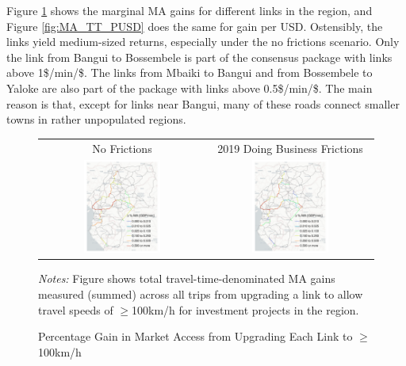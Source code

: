 \documentclass[a4paper]{article}
\begin{document}
Figure \ref{fig:MA_TT_PP} shows the marginal MA gains for different links in the region, and Figure \ref{fig:MA_TT_PUSD} does the same for gain per USD. Ostensibly, the links yield medium-sized returns, especially under the no frictions scenario. Only the link from Bangui to Bossembele is part of the consensus package with links above 1\$/min/\$. The links from Mbaiki to Bangui and from Bossembele to Yaloke are also part of the package with links above  0.5\$/min/\$. The main reason is that, except for links near Bangui, many of these roads connect smaller towns in rather unpopulated regions. 

\begin{figure}[H]  \vspace{-1mm}
\centering
\caption{\label{fig:MA_TT_PP} Percentage Gain in Market Access from Upgrading Each Link to $\geq$100km/h}
\vspace{2mm}
\begin{tabular}{cc}
No Frictions & 2019 Doing Business Frictions \\
\includegraphics[width=0.48\textwidth]{"../figures/PE/trans_CEMAC_network_MA_100_min_speed_perc_planned_projects.pdf"} &
\includegraphics[width=0.48\textwidth]{"../figures/PE/trans_CEMAC_network_MA_100_min_speed_bt_perc_planned_projects.pdf"}  \\ [-0.2em]
\end{tabular}
\raggedright
\scriptsize 
\emph{Notes:} Figure shows total travel-time-denominated MA gains measured (summed) across all trips from upgrading a link to allow travel speeds of $\geq$100km/h for investment projects in the region. 
\end{figure}
\end{document}

